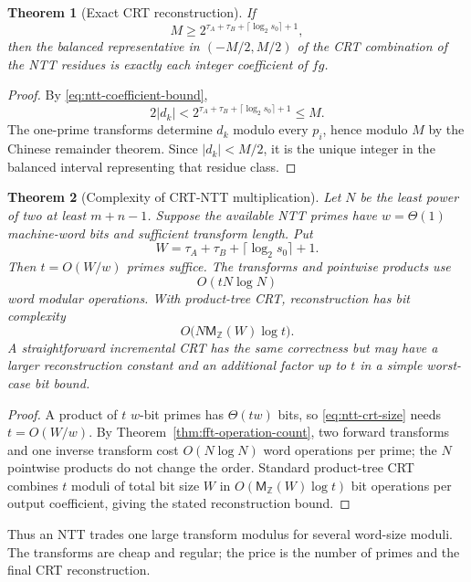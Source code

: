 \documentclass[11pt]{book}
\newtheorem{theorem}{Theorem}[section]
\theoremstyle{definition}
\newcommand{\ZZ}{\mathbb Z}
\newcommand{\MZ}{\mathsf M_{\ZZ}}
\begin{document}
\begin{theorem}[Exact CRT reconstruction]\label{thm:ntt-crt-correct}
If
\begin{equation}\label{eq:ntt-crt-size}
 M\geq
 2^{\tau_A+\tau_B+\lceil\log_2s_0\rceil+1},
\end{equation}
then the balanced representative in $(-M/2,M/2)$ of the CRT combination of
the NTT residues is exactly each integer coefficient of $fg$.
\end{theorem}

\begin{proof}
By \eqref{eq:ntt-coefficient-bound},
\[
 2|d_k|<2^{\tau_A+\tau_B+\lceil\log_2s_0\rceil+1}\leq M.
\]
The one-prime transforms determine $d_k$ modulo every $p_i$, hence modulo
$M$ by the Chinese remainder theorem.  Since $|d_k|<M/2$, it is the unique
integer in the balanced interval representing that residue class.
\end{proof}

\begin{theorem}[Complexity of CRT-NTT multiplication]
Let $N$ be the least power of two at least $m+n-1$.  Suppose the available
NTT primes have $w=\Theta(1)$ machine-word bits and sufficient transform
length.  Put
\[
 W=\tau_A+\tau_B+\lceil\log_2s_0\rceil+1.
\]
Then $t=O(W/w)$ primes suffice.  The transforms and pointwise products use
\[
 O(tN\log N)
\]
word modular operations.  With product-tree CRT, reconstruction has bit
complexity
\[
 O\bigl(N\MZ(W)\log t\bigr).
\]
A straightforward incremental CRT has the same correctness but may have a
larger reconstruction constant and an additional factor up to $t$ in a simple
worst-case bit bound.
\end{theorem}

\begin{proof}
A product of $t$ $w$-bit primes has $\Theta(tw)$ bits, so
\eqref{eq:ntt-crt-size} needs $t=O(W/w)$.  By
Theorem~\ref{thm:fft-operation-count}, two forward transforms and one inverse
transform cost $O(N\log N)$ word operations per prime; the $N$ pointwise
products do not change the order.  Standard product-tree CRT combines $t$
moduli of total bit size $W$ in $O(\MZ(W)\log t)$ bit operations per output
coefficient, giving the stated reconstruction bound.
\end{proof}

Thus an NTT trades one large transform modulus for several word-size moduli.
The transforms are cheap and regular; the price is the number of primes and
the final CRT reconstruction.
\end{document}

